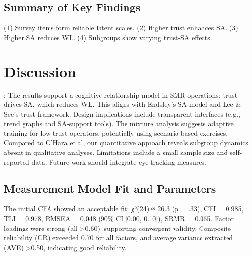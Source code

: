 \documentclass[conference]{IEEEtran}
\begin{document}
\subsection{Summary of Key Findings}
(1) Survey items form reliable latent scales. (2) Higher trust enhances SA. (3) Higher SA reduces WL. (4) Subgroups show varying trust-SA effects.

\section{Discussion}:  
The results support a cognitive relationship model in SMR operations: trust drives SA, which reduces WL. This aligns with Endsley’s SA model and Lee & See’s trust framework. Design implications include transparent interfaces (e.g., trend graphs and SA-support tools). The mixture analysis suggests adaptive training for low-trust operators, potentially using scenario-based exercises. Compared to O’Hara et al, our quantitative approach reveals subgroup dynamics absent in qualitative analyses. Limitations include a small sample size and self-reported data. Future work should integrate eye-tracking measures.  
\subsection{Measurement Model Fit and Parameters}
The initial CFA showed an acceptable fit: χ²(24) ≈ 26.3 (p = .33), CFI = 0.985, TLI = 0.978, RMSEA = 0.048 (90\% CI [0.00, 0.10]), SRMR = 0.065. Factor loadings were strong (all >0.60), supporting convergent validity. Composite reliability (CR) exceeded 0.70 for all factors, and average variance extracted (AVE) >0.50, indicating good reliability. \\ \\ \\\\
\\
\\
\\
\\
\\
\\
\\
\\
\\
\\
\\
\\
\\
\\
\\
\\
\\
\\
\end{document}
